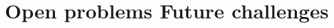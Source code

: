 \documentclass{llncs}
\begin{document}
\section{Open problems Future challenges}
\label{sect:op_fc}

	
	
	
	
\end{document}
